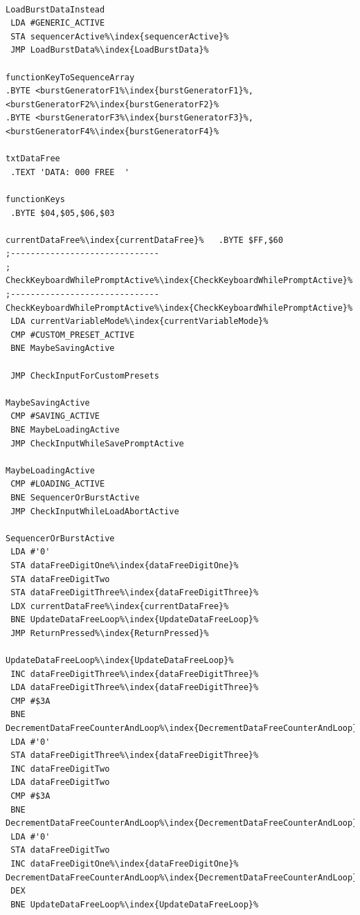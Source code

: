 \begin{minipage}[b]{0.33\linewidth}
\begin{lrbox}{\mybox}%
\begin{lstlisting}[basicstyle=\ttfamily\tiny,escapechar=\%]

LoadBurstDataInstead
 LDA #GENERIC_ACTIVE
 STA sequencerActive%\index{sequencerActive}%
 JMP LoadBurstData%\index{LoadBurstData}%

functionKeyToSequenceArray   
.BYTE <burstGeneratorF1%\index{burstGeneratorF1}%,<burstGeneratorF2%\index{burstGeneratorF2}%
.BYTE <burstGeneratorF3%\index{burstGeneratorF3}%,<burstGeneratorF4%\index{burstGeneratorF4}%

txtDataFree
 .TEXT 'DATA: 000 FREE  '

functionKeys
 .BYTE $04,$05,$06,$03

currentDataFree%\index{currentDataFree}%   .BYTE $FF,$60
;------------------------------
; CheckKeyboardWhilePromptActive%\index{CheckKeyboardWhilePromptActive}%
;------------------------------
CheckKeyboardWhilePromptActive%\index{CheckKeyboardWhilePromptActive}%
 LDA currentVariableMode%\index{currentVariableMode}%
 CMP #CUSTOM_PRESET_ACTIVE
 BNE MaybeSavingActive

 JMP CheckInputForCustomPresets

MaybeSavingActive
 CMP #SAVING_ACTIVE
 BNE MaybeLoadingActive
 JMP CheckInputWhileSavePromptActive

MaybeLoadingActive
 CMP #LOADING_ACTIVE
 BNE SequencerOrBurstActive
 JMP CheckInputWhileLoadAbortActive

SequencerOrBurstActive
 LDA #'0'
 STA dataFreeDigitOne%\index{dataFreeDigitOne}%
 STA dataFreeDigitTwo
 STA dataFreeDigitThree%\index{dataFreeDigitThree}%
 LDX currentDataFree%\index{currentDataFree}%
 BNE UpdateDataFreeLoop%\index{UpdateDataFreeLoop}%
 JMP ReturnPressed%\index{ReturnPressed}%

UpdateDataFreeLoop%\index{UpdateDataFreeLoop}%
 INC dataFreeDigitThree%\index{dataFreeDigitThree}%
 LDA dataFreeDigitThree%\index{dataFreeDigitThree}%
 CMP #$3A
 BNE DecrementDataFreeCounterAndLoop%\index{DecrementDataFreeCounterAndLoop}%
 LDA #'0'
 STA dataFreeDigitThree%\index{dataFreeDigitThree}%
 INC dataFreeDigitTwo
 LDA dataFreeDigitTwo
 CMP #$3A
 BNE DecrementDataFreeCounterAndLoop%\index{DecrementDataFreeCounterAndLoop}%
 LDA #'0'
 STA dataFreeDigitTwo
 INC dataFreeDigitOne%\index{dataFreeDigitOne}%
DecrementDataFreeCounterAndLoop%\index{DecrementDataFreeCounterAndLoop}%
 DEX
 BNE UpdateDataFreeLoop%\index{UpdateDataFreeLoop}%


\end{lstlisting}
\end{lrbox}
\end{minipage}
